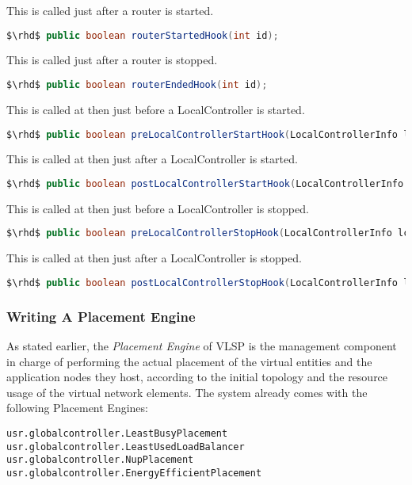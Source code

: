 \noindent This is called just after a router is started.
\begin{lstlisting}[language=Java]
     $\rhd$ public boolean routerStartedHook(int id);
\end{lstlisting}

\noindent This is called just after a router is stopped.
\begin{lstlisting}[language=Java]
    $\rhd$ public boolean routerEndedHook(int id);
\end{lstlisting}

\noindent This is called at then just before a LocalController is started.
\begin{lstlisting}[language=Java]
    $\rhd$ public boolean preLocalControllerStartHook(LocalControllerInfo lcInfo);
\end{lstlisting}

\noindent This is called at then just after a LocalController is started.
\begin{lstlisting}[language=Java]
    $\rhd$ public boolean postLocalControllerStartHook(LocalControllerInfo lcInfo);
\end{lstlisting}

\noindent This is called at then just before a LocalController is stopped.
\begin{lstlisting}[language=Java]
    $\rhd$ public boolean preLocalControllerStopHook(LocalControllerInfo lcInfo);
\end{lstlisting}

\noindent This is called at then just after a LocalController is stopped.
\begin{lstlisting}[language=Java]
    $\rhd$ public boolean postLocalControllerStopHook(LocalControllerInfo lcInfo);
\end{lstlisting}



\subsubsection{Writing A Placement Engine}

As stated earlier, the \emph{Placement
Engine} of VLSP is the management component in charge of performing the
actual placement of the virtual entities and the application nodes
they host, according to the initial topology and the resource usage of
the virtual network elements.
The system already comes with the following Placement Engines:

\begin{adjustwidth}{\parindent}{} %
\begin{verbatim}
usr.globalcontroller.LeastBusyPlacement
usr.globalcontroller.LeastUsedLoadBalancer
usr.globalcontroller.NupPlacement
usr.globalcontroller.EnergyEfficientPlacement
\end{verbatim}
\end{adjustwidth}

